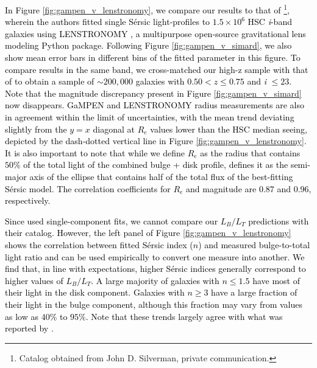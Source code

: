 \documentclass[linenumbers,twocolumn,twocolappendix]{aastex631}
\newcommand\sersic{S\'ersic}
\newcommand\gampen{GaMPEN}
\newcommand\lenstronomy{LENSTRONOMY}
\newcommand\ib{\textit{i}}
\begin{document}
\begin{CJK*}{UTF8}{gbsn}
\textcolor{black}{In Figure \ref{fig:gampen_v_lenstronomy}, we compare our results to that of \citet{hsc_sersic}\footnote{Catalog obtained from John D. Silverman, private communication.}, wherein the authors fitted single \sersic{} light-profiles to $1.5\times10^6$ HSC \ib{}-band galaxies using \lenstronomy{} \citep{Birrer2018Lenstronomy:Package}, a multipurpose open-source gravitational lens modeling Python package. Following Figure \ref{fig:gampen_v_simard}, we also show mean error bars in different bins of the fitted parameter in this figure. To compare results in the same band, we cross-matched our high-z sample with that of \citet{hsc_sersic} to obtain a sample of $\sim200,000$ galaxies with $0.50 < z \leq 0.75$ and \ib{} $\leq23$. Note that the magnitude discrepancy present in Figure \ref{fig:gampen_v_simard} now disappears. \gampen{} and \lenstronomy{} radius measurements are also in agreement within the limit of uncertainties, with the mean trend deviating slightly from the $y=x$ diagonal at $R_e$ values lower than the HSC median seeing, depicted by the dash-dotted vertical line in Figure \ref{fig:gampen_v_lenstronomy}. It is also important to note that while we define $R_e$ as the radius that contains $50\%$ of the total light of the combined bulge + disk profile, \citet{hsc_sersic} defines it as the semi-major axis of the ellipse that contains half of the total flux of the best-fitting \sersic{} model. The correlation coefficients for $R_e$ and magnitude are 0.87 and 0.96, respectively.} 

\textcolor{black}{Since \citet{hsc_sersic} used single-component fits, we cannot compare our $L_B/L_T$ predictions with their catalog. However, the left panel of Figure \ref{fig:gampen_v_lenstronomy} shows the correlation between fitted \sersic{} index ($n$) and measured bulge-to-total light ratio and can be used empirically to convert one measure into another. We find that, in line with expectations, higher \sersic{} indices generally correspond to higher values of $L_B/L_T$. A large majority of galaxies with $n \leq 1.5$ have most of their light in the disk component. Galaxies with $ n \geq 3$ have a large fraction of their light in the bulge component, although this fraction may vary from values as low as $40\%$ to $95\%$. Note that these trends largely agree with what was reported by \citet{simmons_08}.}



\end{CJK*}
\end{document}
